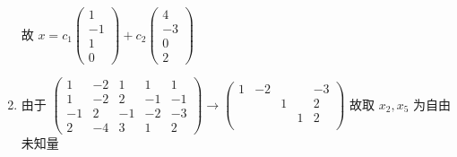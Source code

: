 \begin{enumerate}
                   故 \( x = c_{1}\begin{pmatrix}
                       1  \\
                       -1 \\
                       1  \\
                       0
                   \end{pmatrix} + c_{2}\begin{pmatrix}
                       4  \\
                       -3 \\
                       0  \\
                       2
                   \end{pmatrix} \)
             \item %
                   由于 \( \begin{pmatrix}
                       1  & -2 & 1  & 1  & 1  \\
                       1  & -2 & 2  & -1 & -1 \\
                       -1 & 2  & -1 & -2 & -3 \\
                       2  & -4 & 3  & 1  & 2
                   \end{pmatrix} \rightarrow \begin{pmatrix}
                       1 & -2 &   &   & -3 \\
                         &    & 1 &   & 2  \\
                         &    &   & 1 & 2  \\
                         &    &   &   &
                   \end{pmatrix} \) 故取 \( x_{2}, x_{5} \) 为自由未知量


\end{enumerate}
